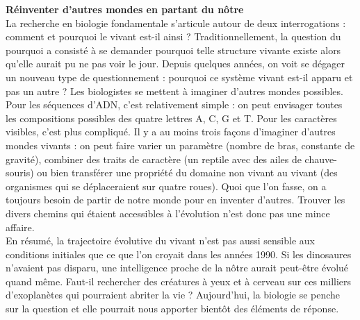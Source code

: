 \documentclass[8pt]{article}
\begin{document}
\textbf{Réinventer d’autres mondes en partant du nôtre}\\

La recherche en biologie fondamentale s’articule autour de deux interrogations : comment et pourquoi le vivant est-il ainsi ? Traditionnellement, la question du pourquoi a consisté à se demander pourquoi telle structure vivante existe alors qu’elle aurait pu ne pas voir le jour. Depuis quelques années, on voit se dégager un nouveau type de questionnement : pourquoi ce système vivant est-il apparu et pas un autre ? Les biologistes se mettent à imaginer d’autres mondes possibles.\\

Pour les séquences d’ADN, c’est relativement simple : on peut envisager toutes les compositions possibles des quatre lettres A, C, G et T. Pour les caractères visibles, c’est plus compliqué. Il y a au moins trois façons d’imaginer d’autres mondes vivants : on peut faire varier un paramètre (nombre de bras, constante de gravité), combiner des traits de caractère (un reptile avec des ailes de chauve-souris) ou bien transférer une propriété du domaine non vivant au vivant (des organismes qui se déplaceraient sur quatre roues). Quoi que l’on fasse, on a toujours besoin de partir de notre monde pour en inventer d’autres. Trouver les divers chemins qui étaient accessibles à l’évolution n’est donc pas une mince affaire.\\

En résumé, la trajectoire évolutive du vivant n’est pas aussi sensible aux conditions initiales que ce que l’on croyait dans les années 1990. Si les dinosaures n’avaient pas disparu, une intelligence proche de la nôtre aurait peut-être évolué quand même. Faut-il rechercher des créatures à yeux et à cerveau sur ces milliers d’exoplanètes qui pourraient abriter la vie ? Aujourd’hui, la biologie se penche sur la question et elle pourrait nous apporter bientôt des éléments de réponse.\\
\end{document}
